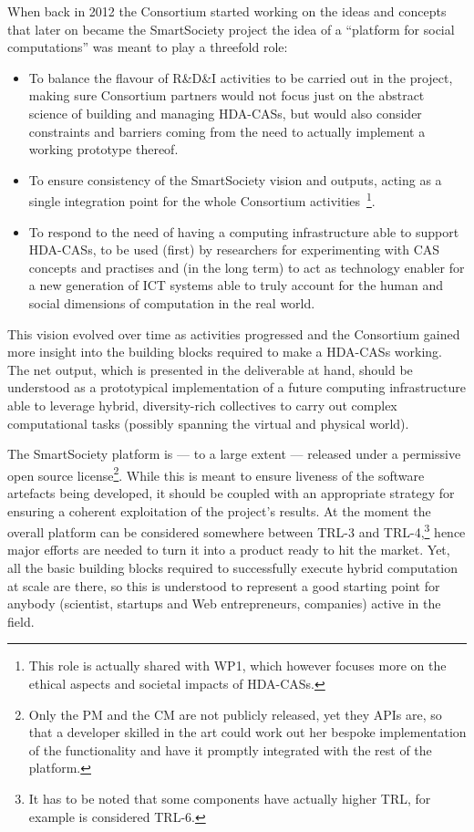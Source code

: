 When back in 2012 the Consortium started working on the ideas and concepts that later on became the SmartSociety project the idea of a ``platform for social computations'' was meant to play a threefold role:
\begin{itemize}
\item To balance the flavour of R\&D\&I activities to be carried out in the project, making sure Consortium partners would not focus just on the abstract science of building and managing HDA-CASs, but would also consider constraints and barriers coming from the need to actually implement a working prototype thereof.
\item To ensure consistency of the SmartSociety vision and outputs, acting as a single integration point for the whole Consortium activities~\footnote{This role is actually shared with WP1, which however focuses more on the ethical aspects and societal impacts of HDA-CASs.}.
\item To respond to the need of having a computing infrastructure able to support HDA-CASs, to be used (first) by researchers for experimenting with CAS concepts and practises and (in the long term) to act as technology enabler for a new generation of ICT systems able to truly account for the human and social dimensions of computation in the real world.
\end{itemize}  

This vision evolved over time as activities progressed and the Consortium gained more insight into the building blocks required to make a HDA-CASs working. The net output, which is presented in the deliverable at hand, should be understood as a prototypical implementation of a future computing infrastructure able to leverage hybrid, diversity-rich collectives to carry out complex computational tasks (possibly spanning the virtual and physical world).

The SmartSociety platform is --- to a large extent --- released under a permissive open source license\footnote{Only the PM and the CM are not publicly released, yet they APIs are, so that a developer skilled in the art could work out her bespoke implementation of the functionality and have it promptly integrated with the rest of the platform.}. While this is meant to ensure liveness of the software artefacts being developed, it should be coupled with an appropriate strategy for ensuring a coherent exploitation of the project's results. At the moment the overall platform can be considered somewhere between TRL-3 and TRL-4,\footnote{It has to be noted that some components have actually higher TRL, for example \mdl is considered TRL-6.} hence major efforts are needed to turn it into a product ready to hit the market. Yet, all the basic building blocks required to successfully execute hybrid computation at scale are there, so this is understood to represent a good starting point for anybody (scientist, startups and Web entrepreneurs, companies) active in the field.

